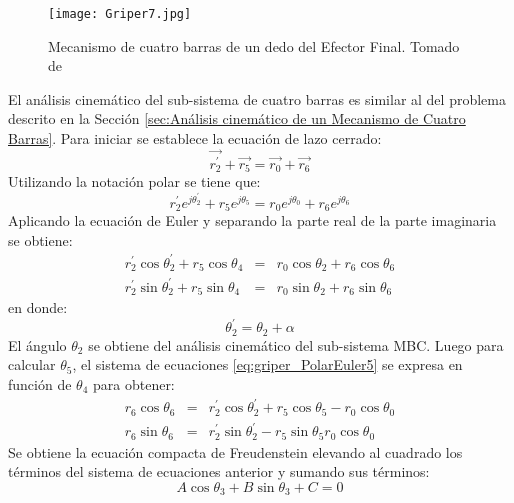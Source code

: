 \begin{figure}[htb]
    \centering
     \texttt{[image: Griper7.jpg]}
    \caption [Mecanismo de cuatro barras de un dedo del Efector Final.]{Mecanismo de cuatro barras de un dedo del Efector Final. Tomado de \cite{zapata_zapata_control_2017} }
    \label{fig:Griper_MEC}
\end{figure}
El análisis cinemático del sub-sistema de cuatro barras es similar al del problema descrito en la Sección \ref{sec:Análisis cinemático de un Mecanismo de Cuatro Barras}. Para iniciar se establece la ecuación de lazo cerrado:
\begin{equation}\label{eq:griper_lazo}
\vec{r^{\prime}_2}+\vec{r_5}=\vec{r_0}+\vec{r_6}
\end{equation}
Utilizando la notación polar se tiene que:
\begin{equation}\label{eq:griper_lazoPolar}
r^{\prime}_2e^{j\theta^{\prime}_2}+r_5e^{j\theta_5}=r_0e^{j\theta_0}+r_6e^{j\theta_6}
\end{equation}
Aplicando la ecuación de Euler y separando la parte real de la parte imaginaria se obtiene:
\begin{eqnarray}
r^{\prime}_2 \cos{\theta^{\prime}_2}+r_5\cos{\theta_4}&=&r_0\cos{\theta_2} +r_6\cos{\theta_6} \label{eq:griper_PolarEuler5} \\
r^{\prime}_2 \sin{\theta^{\prime}_2}+r_5\sin{\theta_4} &=&r_0\sin{\theta_2}+r_6\sin{\theta_6}\label{eq:griper_PolarEuler6}
\end{eqnarray}
en donde:
\begin{equation}
\theta^{\prime}_2=\theta_2+\alpha
\end{equation}
El ángulo $\theta_2$ se obtiene del análisis cinemático del sub-sistema MBC. Luego para calcular $\theta_5$, el sistema de ecuaciones \ref{eq:griper_PolarEuler5} se expresa en función de $\theta_4$ para obtener:
\begin{eqnarray}
r_6\cos{\theta_6}&=& r^{\prime}_2\cos{\theta^{\prime}_2}+r_5\cos{\theta_5}-r_0\cos{\theta_0}\label{eq:griper_PolarEuler7} \\
r_6\sin{\theta_6} &=&r^{\prime}_2\sin{\theta^{\prime}_2}-r_5\sin{\theta_5}r_0\cos{\theta_0}\label{eq:griper_PolarEuler8}
\end{eqnarray}
Se obtiene la ecuación compacta de Freudenstein elevando al cuadrado los términos del sistema de ecuaciones anterior y sumando sus términos:
\begin{equation} \label{eq:griper_A1B1C1}
 A\cos{\theta_3}+B\sin{\theta_3}+C=0 
\end{equation}
